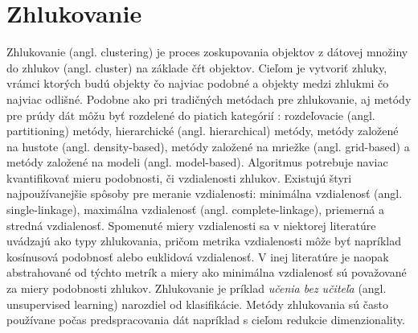 \section{Zhlukovanie}
Zhlukovanie (angl. clustering) je proces zoskupovania objektov z dátovej množiny do zhlukov (angl. cluster) na základe čŕt objektov. Cieľom je vytvoriť zhluky, vrámci ktorých budú objekty čo najviac podobné a objekty medzi zhlukmi čo najviac odlišné. Podobne ako pri tradičných metódach pre zhlukovanie, aj metódy pre prúdy dát môžu byť rozdelené do piatich kategórií \citep{nguyen2015survey, aggarwal2014survey}: rozdeľovacie (angl. partitioning) metódy, hierarchické (angl. hierarchical) metódy, metódy založené na hustote (angl. density-based), metódy založené na mriežke (angl. grid-based) a metódy založené na modeli (angl. model-based). Algoritmus potrebuje naviac kvantifikovať mieru podobnosti, či vzdialenosti zhlukov. Existujú štyri najpoužívanejšie spôsoby pre meranie vzdialenosti: minimálna vzdialenosť (angl. single-linkage), maximálna vzdialenosť (angl. complete-linkage), priemerná a stredná vzdialenosť. Spomenuté miery vzdialenosti sa v niektorej literatúre uvádzajú ako typy zhlukovania, pričom metrika vzdialenosti môže byť napríklad kosínusová podobnosť alebo euklidová vzdialenosť. V inej literatúre je naopak abstrahované od týchto metrík a miery ako minimálna vzdialenosť sú považované za miery podobnosti zhlukov. Zhlukovanie je príklad \textit{učenia bez učiteľa} (angl. unsupervised learning) narozdiel od klasifikácie. Metódy zhlukovania sú často používane počas predspracovania dát napríklad s cieľom redukcie dimenzionality.

